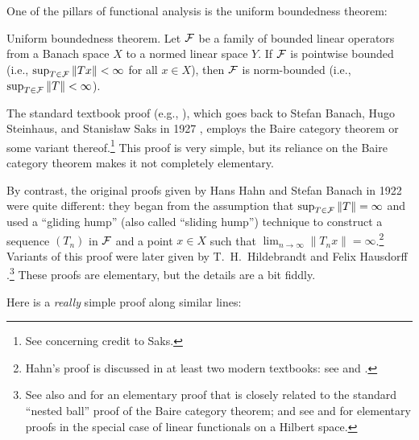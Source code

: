 \documentclass[12pt]{article}
\begin{document}
\clearpage


One of the pillars of functional analysis is the
uniform boundedness theorem:

\bigskip

{\sc Uniform boundedness theorem.}
Let ${\mathcal{F}}$ be a family of bounded linear operators
from a Banach space $X$ to a normed linear space $Y$.
If ${\mathcal{F}}$ is pointwise bounded
(i.e., $\sup_{T \in {\mathcal{F}}} \|Tx\| < \infty$ for all $x \in X$),
then ${\mathcal{F}}$ is norm-bounded
(i.e., $\sup_{T \in {\mathcal{F}}} \|T\| < \infty$).

\bigskip

The standard textbook proof
(e.g., \cite[p.~81]{Reed_72}),
which goes back to Stefan Banach, Hugo Steinhaus,
and Stanis\l{}aw Saks in 1927 \cite{Banach_27},
employs the Baire category theorem or some variant thereof.\footnote{
   See \cite[p.~319, note~67]{Birkhoff_84} concerning credit to Saks.
}
This proof is very simple,
but its reliance on the Baire category theorem makes it
not completely elementary.

By contrast, the original proofs
given by Hans Hahn \cite{Hahn_22} and Stefan Banach \cite{Banach_22}
in 1922 were quite different:
they began from the assumption that $\sup_{T \in {\mathcal{F}}} \|T\| = \infty$
and used a ``gliding hump'' (also called ``sliding hump'') technique
to construct a sequence $(T_n)$ in ${\mathcal{F}}$ and a point $x \in X$
such that $\lim_{n \to\infty} \|T_n x \| = \infty$.\footnote{
   Hahn's proof is discussed in at least two modern textbooks:
   see \cite[Exercise~1.76, p.~49]{Megginson_98} and
   \cite[Exercise~3.15, pp.~71--72]{MacCluer_09}.
}
Variants of this proof were later given by
T.~H.~Hildebrandt \cite{Hildebrandt_23}
and Felix Hausdorff \cite{Hausdorff_32,Hennefeld_80}.\footnote{
   See also \cite[pp.~63--64]{Riesz_55} and \cite[pp.~74--75]{Weidmann_80}
   for an elementary proof that is closely related to the standard
   ``nested ball'' proof of the Baire category theorem;
   and see \cite[Problem 27, pp.~14--15 and 184]{Halmos_67}
   and \cite{Holland_69} for elementary proofs
   in the special case of linear functionals on a Hilbert space.
}
These proofs are elementary, but the details are a bit fiddly.

Here is a {\em really}\/ simple proof
along similar lines:
\end{document}
